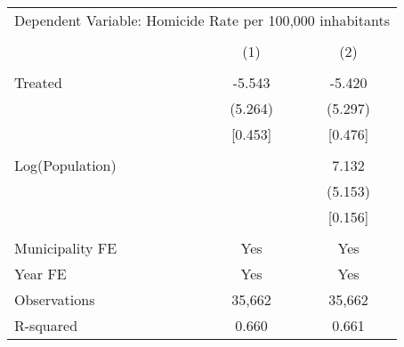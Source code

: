 \documentclass[]{article}
\begin{document}
\begin{table}[!htbp]
\centering
\begin{tabular}{lcc}
\hline
\multicolumn{3}{c}{Dependent Variable: Homicide Rate per 100,000 inhabitants} \\\\
\hline
 & (1) & (2) \\
\hline
 & & \\
Treated & -5.543 & -5.420 \\
 & (5.264) & (5.297) \\
 & [0.453] & [0.476] \\\\
Log(Population) &  & 7.132 \\
 &  & (5.153) \\
 &  & [0.156] \\
 & & \\
 \midrule
 Municipality FE & Yes & Yes \\
Year FE & Yes & Yes \\
Observations & 35,662 & 35,662 \\
R-squared & 0.660 & 0.661 \\
\hline
\end{tabular}
\end{table}
\end{document}

